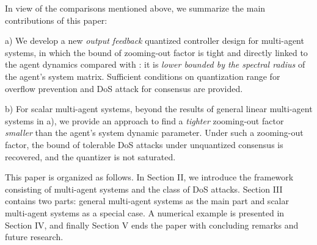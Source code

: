 \documentclass[letterpaper,journal,final,twocolumn]{IEEEtran}
\begin{document}
 



	
In view of the comparisons mentioned above, we summarize the main contributions of this paper:

a) We develop a new \emph{output feedback} quantized controller design for multi-agent systems, in which the bound of zooming-out factor is tight and directly linked to the agent dynamics compared with \cite{feng2020arxiv}: it is \emph{lower bounded by the spectral radius} of the agent's system matrix. Sufficient conditions on quantization range for overflow prevention and DoS attack for consensus are provided.     

b) For scalar multi-agent systems, beyond the results of general linear multi-agent systems in a), we provide an approach to find a \emph{tighter} zooming-out factor \emph{smaller} than the agent's system dynamic parameter. Under such a zooming-out factor, the bound of tolerable DoS attacks under unquantized consensus is recovered, and the quantizer is not saturated. 	



This paper is organized as follows. In Section II, we introduce the framework consisting of multi-agent systems and the class of DoS attacks. Section III contains two parts: general multi-agent systems as the main part and scalar multi-agent systems as a special case. 
A numerical example is presented in Section IV, and finally Section V ends the paper with concluding remarks and future research.
\end{document}

